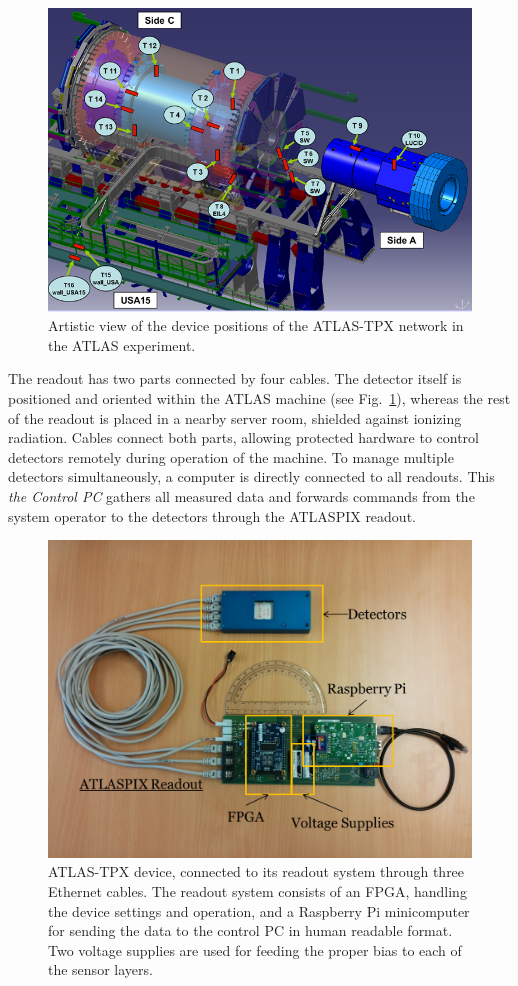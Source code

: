 \documentclass[conference]{IEEEtran}
\begin{document}
\begin{figure}[tbp]
	\centering
        \includegraphics[clip, width=.45\textwidth, angle = 0 ]{Plots/ATLASTPX.png}
      \caption {Artistic view of the device positions of the ATLAS-TPX network in the ATLAS experiment.}
    \label{fig:positions}
\end{figure}

The readout has two parts connected by four cables. The detector itself is positioned and oriented within the ATLAS machine (see Fig.~\ref{fig:positions}), whereas the rest of the readout is placed in a nearby server room, shielded against ionizing radiation. Cables connect both parts, allowing protected hardware to control detectors remotely during operation of the machine. To manage multiple detectors simultaneously, a computer is directly connected to all readouts. This \textit{the Control PC} gathers all measured data and forwards commands from the system operator to the detectors through the ATLASPIX readout.

\begin{figure}[tbp]
	\centering
        \includegraphics[clip,width=.45\textwidth, angle = 0 ]{Plots/ATLASPIX.png}
      \caption {ATLAS-TPX device, connected to its readout system through three Ethernet cables. The readout system consists of an FPGA, handling the device settings and operation, and a Raspberry Pi minicomputer for sending the data to the control PC in human readable format. Two voltage supplies are used for feeding the proper bias to each of the sensor layers.}
    \label{fig:device_with_readout}
\end{figure}
\end{document}

